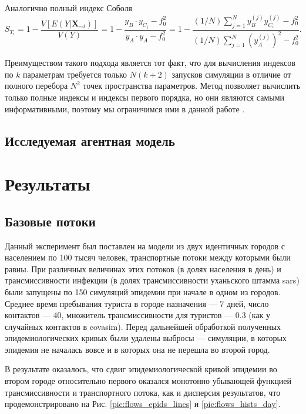 \documentclass[a4paper,12pt]{article} %
\begin{document}
\begin{itemize}
Аналогично полный индекс Соболя
\begin{displaymath}
S_{T_i}=1-\frac{V[E(Y|\bm{X}_{\sim i})]}{V(Y)}=1-\frac{y_B\cdot y_{C_i}-f_0^2}{y_A\cdot y_A -f_0^2}=1-\frac{(1/N)\sum_{j=1}^N y_B^{(j)}y_{C_i}^{(j)} - f_0^2}{(1/N)\sum_{j=1}^N (y_A^{(j)})^2 - f_0^2}.
\end{displaymath}
\end{itemize}

Преимуществом такого подхода является тот факт, что для вычисления индексов по $k$ параметрам требуется только $N(k+2)$ запусков симуляции в отличие от полного перебора $N^2$ точек пространства параметров. Метод позволяет вычислить только полные индексы и индексы первого порядка, но они являются самыми информативными, поэтому мы ограничимся ими в данной работе \cite{saltelli2008global}.


\subsection{Исследуемая агентная модель}
\section{Результаты}

\subsection{Базовые потоки}
Данный эксперимент был поставлен на модели из двух идентичных городов с населением по 100 тысяч человек, транспортные потоки между которыми были равны. При различных величинах этих потоков (в долях населения в день) и трансмиссивности инфекции (в долях трансмиссивности уханьского штамма \gls{sars}) были запущены по 150 симуляций эпидемии при начале в одном из городов. Среднее время пребывания туриста в городе назначения --- 7 дней, число контактов --- 40, множитель трансмиссивности для туристов --- 0.3 (как у случайных контактов в \gls{covasim}). Перед дальнейшей обработкой полученных эпидемиологических кривых были удалены выбросы --- симуляции, в которых эпидемия не началась вовсе и в которых она не перешла во второй город. 

В результате оказалось, что сдвиг эпидемиологической кривой эпидемии во втором городе относительно первого оказался монотонно убывающей функцией трансмиссивности и транспортного потока, как и дисперсия результатов, что продемонстрировано на Рис. \ref{pic:flows_epids_lines} и \ref{pic:flows_hists_day}.
\end{document}
